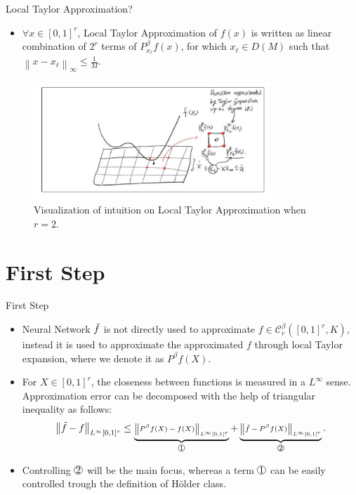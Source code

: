 \documentclass{if-beamer}
\newcommand*\circled[1]{\tikz[baseline=(char.base)]{
            \node[shape=circle,draw,inner sep=0.2pt] (char) {#1};}}
\begin{document}
\begin{frame}{Local Taylor Approximation?}
    \begin{itemize}
        \item $\forall x \in [0,1]^{r}$, Local Taylor Approximation of $f(x)$ is written as linear combination of $2^{r}$ terms of $P^{\beta}_{x_{\ell}}f(x)$, for which $x_{\ell}\in D(M)$ such that $\left\| x - x_{\ell} \right\|_{\infty}\leq \frac{1}{M}$.
    \end{itemize}
    \begin{figure}[htbp]
        \includegraphics[width=0.8\textwidth]{LTA.png}
        \caption{ Visualization of intuition on Local Taylor Approximation when $r=2$.}
        \label{fig:figure1}
    \end{figure}
\end{frame}

\section{First Step}
\begin{frame}{First Step}
    \begin{itemize}
    \item Neural Network $\Tilde{f}$ is not directly used to approximate $f\in\mathcal{C}^{\beta}_{r}([0,1]^{r},K)$, instead it is used to approximate the approximated $f$ through local Taylor expansion, where we denote it as $P^{\beta}f(X)$.
    \item For $X\in[0,1]^{r}$, the closeness between functions is measured in a $L^{\infty}$ sense. Approximation error can be decomposed with the help of triangular inequality as follows:
    \begin{eqnarray*}
        \scriptsize
        \left\| \Tilde{f} - f \right\|_{L^\infty[0,1]^{r}}
        \leq \underbrace{\left\| P^{\beta}f(X) - f(X) \right\|_{L^\infty[0,1]^{r}}}_{\circled{1}} + 
        \underbrace{\left\| \Tilde{f} - P^{\beta}f(X) \right\|_{L^\infty[0,1]^{r}}}_{\circled{2}} .
    \end{eqnarray*}
    
    \item Controlling $\circled{2}$ will be the main focus, whereas a term $\circled{1}$ can be easily controlled trough the definition of H\"older class. 
    \end{itemize}
\end{frame}
\end{document}

